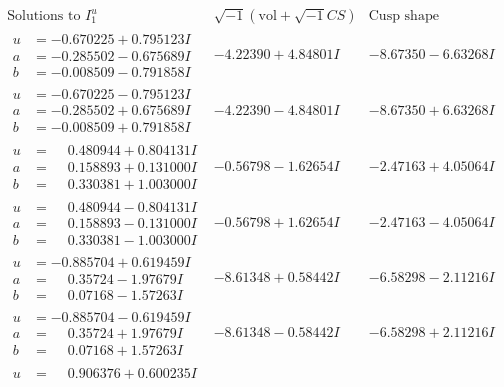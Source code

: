 \documentclass[1p]{elsarticle_modified}
\theoremstyle{definition}
\newcommand{\I}{\sqrt{-1}}
\begin{document}
$$\begin{array}{c|c|c}  
\text{Solutions to }I^u_{1}& \I (\text{vol} + \sqrt{-1}CS) & \text{Cusp shape}\\
 \hline 
\begin{aligned}
u &= -0.670225 + 0.795123 I \\
a &= -0.285502 - 0.675689 I \\
b &= -0.008509 - 0.791858 I\end{aligned}
 & -4.22390 + 4.84801 I & -8.67350 - 6.63268 I \\ \hline\begin{aligned}
u &= -0.670225 - 0.795123 I \\
a &= -0.285502 + 0.675689 I \\
b &= -0.008509 + 0.791858 I\end{aligned}
 & -4.22390 - 4.84801 I & -8.67350 + 6.63268 I \\ \hline\begin{aligned}
u &= \phantom{-}0.480944 + 0.804131 I \\
a &= \phantom{-}0.158893 + 0.131000 I \\
b &= \phantom{-}0.330381 + 1.003000 I\end{aligned}
 & -0.56798 - 1.62654 I & -2.47163 + 4.05064 I \\ \hline\begin{aligned}
u &= \phantom{-}0.480944 - 0.804131 I \\
a &= \phantom{-}0.158893 - 0.131000 I \\
b &= \phantom{-}0.330381 - 1.003000 I\end{aligned}
 & -0.56798 + 1.62654 I & -2.47163 - 4.05064 I \\ \hline\begin{aligned}
u &= -0.885704 + 0.619459 I \\
a &= \phantom{-}0.35724 - 1.97679 I \\
b &= \phantom{-}0.07168 - 1.57263 I\end{aligned}
 & -8.61348 + 0.58442 I & -6.58298 - 2.11216 I \\ \hline\begin{aligned}
u &= -0.885704 - 0.619459 I \\
a &= \phantom{-}0.35724 + 1.97679 I \\
b &= \phantom{-}0.07168 + 1.57263 I\end{aligned}
 & -8.61348 - 0.58442 I & -6.58298 + 2.11216 I \\ \hline\begin{aligned}
u &= \phantom{-}0.906376 + 0.600235 I \\

\end{aligned}
\end{array}$$
\end{document}
